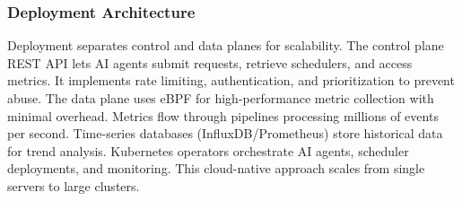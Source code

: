 \subsubsection{Deployment Architecture}
Deployment separates control and data planes for scalability. The control plane REST API lets AI agents submit requests, retrieve schedulers, and access metrics. It implements rate limiting, authentication, and prioritization to prevent abuse. The data plane uses eBPF for high-performance metric collection with minimal overhead. Metrics flow through pipelines processing millions of events per second. Time-series databases (InfluxDB/Prometheus) store historical data for trend analysis. Kubernetes operators orchestrate AI agents, scheduler deployments, and monitoring. This cloud-native approach scales from single servers to large clusters.